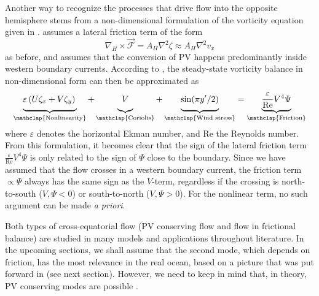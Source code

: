 Another way to recognize the processes that drive flow into the opposite hemisphere stems from a non-dimensional formulation of the vorticity equation given in \cite{bryan1963}. \citeauthor{bryan1963} assumes a lateral friction term of the form
%
\begin{equation}
\nabla_H \times \vec{\mathcal{F}} = A_H \nabla^2 \zeta \approx A_H \nabla^2 v_x
\end{equation}
%
as before, and assumes that the conversion of \ac{PV} happens predominantly inside western boundary currents. According to \citeauthor{bryan1963}, the steady-state vorticity balance in non-dimensional form can then be approximated as
%
\begin{equation}
\underbrace{\varepsilon \left( U \zeta_x + V \zeta_y \right) \vphantom{\frac{\varepsilon}{\text{Re}}}}_{\mathclap{\text{Nonlinearity}}} %
+ \underbrace{V \vphantom{\frac{\varepsilon}{\text{Re}}}}_{\mathclap{\text{Coriolis}}} %
+ \underbrace{\sin(\pi y'/2) \vphantom{\frac{\varepsilon}{\text{Re}}}}_{\mathclap{\text{Wind stress}}} %
=%
\underbrace{\frac{\varepsilon}{\text{Re}} V^4 \Psi}_{\mathclap{\text{Friction}}}
\end{equation}
%
where \(\varepsilon\) denotes the horizontal Ekman number, and \(\text{Re}\) the Reynolds number. From this formulation, it becomes clear that the sign of the lateral friction term \(\frac{\varepsilon}{\text{Re}} V^4 \Psi\) is only related to the sign of \(\Psi\) close to the boundary. Since we have assumed that the flow crosses in a western boundary current, the friction term \(\propto \Psi\) always has the same sign as the \(V\)-term, regardless if the crossing is north-to-south (\(V, \Psi < 0\)) or south-to-north (\(V, \Psi > 0\)). For the nonlinear term, no such argument can be made \emph{a priori}.

\parabreak

Both types of cross-equatorial flow (\ac{PV} conserving flow and flow in frictional balance) are studied in many models and applications throughout literature. In the upcoming sections, we shall assume that the second mode, which depends on friction, has the most relevance in the real ocean, based on a picture that was put forward in \cite{killworth} (see next section). However, we need to keep in mind that, in theory, \ac{PV} conserving modes are possible \citep{nofbc2}.

